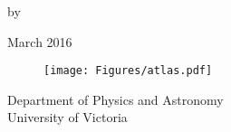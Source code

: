 \pagebreak

\vspace{20mm}

{
\centering
\thesistitle
\tpbreak
by
\tpbreak
\nameanddegrees
\tpbreak
}
{
\begin{center}
March 2016
\end{center}
}
\vspace{30mm}

\begin{figure}[h]
\centering
\texttt{[image: Figures/atlas.pdf]}
\end{figure}

{
\centering
\tpbreak
Department of Physics and Astronomy\\
University of Victoria\\
\tpbreak
}


\vfill
\pagebreak
